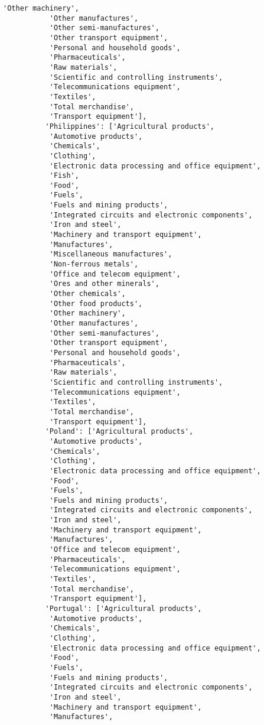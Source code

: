 \documentclass[11pt]{article}
\begin{document}
\begin{Verbatim}[commandchars=\\\{\}]
           'Other machinery',
           'Other manufactures',
           'Other semi-manufactures',
           'Other transport equipment',
           'Personal and household goods',
           'Pharmaceuticals',
           'Raw materials',
           'Scientific and controlling instruments',
           'Telecommunications equipment',
           'Textiles',
           'Total merchandise',
           'Transport equipment'],
          'Philippines': ['Agricultural products',
           'Automotive products',
           'Chemicals',
           'Clothing',
           'Electronic data processing and office equipment',
           'Fish',
           'Food',
           'Fuels',
           'Fuels and mining products',
           'Integrated circuits and electronic components',
           'Iron and steel',
           'Machinery and transport equipment',
           'Manufactures',
           'Miscellaneous manufactures',
           'Non-ferrous metals',
           'Office and telecom equipment',
           'Ores and other minerals',
           'Other chemicals',
           'Other food products',
           'Other machinery',
           'Other manufactures',
           'Other semi-manufactures',
           'Other transport equipment',
           'Personal and household goods',
           'Pharmaceuticals',
           'Raw materials',
           'Scientific and controlling instruments',
           'Telecommunications equipment',
           'Textiles',
           'Total merchandise',
           'Transport equipment'],
          'Poland': ['Agricultural products',
           'Automotive products',
           'Chemicals',
           'Clothing',
           'Electronic data processing and office equipment',
           'Food',
           'Fuels',
           'Fuels and mining products',
           'Integrated circuits and electronic components',
           'Iron and steel',
           'Machinery and transport equipment',
           'Manufactures',
           'Office and telecom equipment',
           'Pharmaceuticals',
           'Telecommunications equipment',
           'Textiles',
           'Total merchandise',
           'Transport equipment'],
          'Portugal': ['Agricultural products',
           'Automotive products',
           'Chemicals',
           'Clothing',
           'Electronic data processing and office equipment',
           'Food',
           'Fuels',
           'Fuels and mining products',
           'Integrated circuits and electronic components',
           'Iron and steel',
           'Machinery and transport equipment',
           'Manufactures',

\end{Verbatim}
\end{document}
